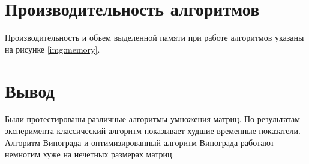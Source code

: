 \section{Производительность алгоритмов}

Производительность и объем выделенной памяти при работе алгоритмов указаны на рисунке \ref{img:memory}.


\section*{Вывод}

Были протестированы различные алгоритмы умножения матриц. По результатам эксперимента классический алгоритм показывает худшие временные показатели. Алгоритм Винограда и оптимизированный алгоритм Винограда работают немногим хуже на нечетных размерах матриц.